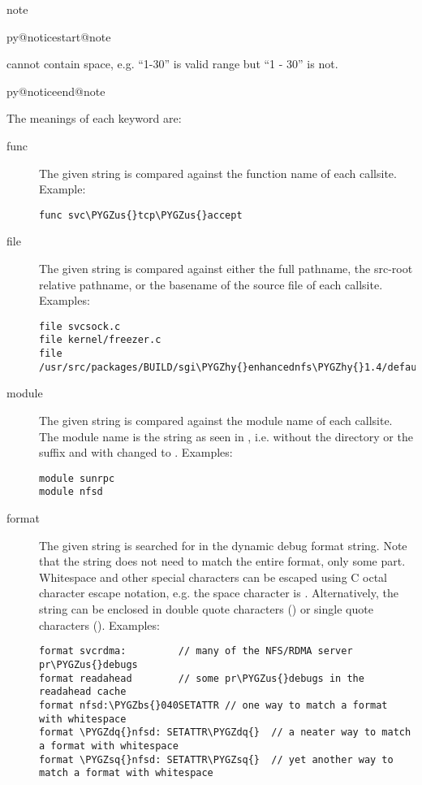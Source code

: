 \documentclass[a4paper,8pt,english]{sphinxmanual}
\makeatletter
\renewenvironment{notice}[2]{%
          \def\py@noticetype{#1}
          \begin{coloredbox}{#1}
          \bf\it
          \par\strong{#2}
          \csname py@noticestart@#1\endcsname
        }
	{
          \csname py@noticeend@\py@noticetype\endcsname
          \end{coloredbox}
        }
\def\PYGZbs{\char`\\}
\def\PYGZus{\char`\_}
\def\PYGZhy{\char`\-}
\def\PYGZsq{\char`\'}
\def\PYGZdq{\char`\"}
\renewcommand\PYGZsq{\textquotesingle}
\makeatother
\begin{document}
\begin{notice}{note}{Note:}
 cannot contain space, e.g.
``1-30'' is valid range but ``1 - 30'' is not.
\end{notice}

The meanings of each keyword are:
\begin{description}
\item[{func}] \leavevmode
The given string is compared against the function name
of each callsite.  Example:

\begin{Verbatim}[commandchars=\\\{\}]
func svc\PYGZus{}tcp\PYGZus{}accept
\end{Verbatim}

\item[{file}] \leavevmode
The given string is compared against either the full pathname, the
src-root relative pathname, or the basename of the source file of
each callsite.  Examples:

\begin{Verbatim}[commandchars=\\\{\}]
file svcsock.c
file kernel/freezer.c
file /usr/src/packages/BUILD/sgi\PYGZhy{}enhancednfs\PYGZhy{}1.4/default/net/sunrpc/svcsock.c
\end{Verbatim}

\item[{module}] \leavevmode
The given string is compared against the module name
of each callsite.  The module name is the string as
seen in , i.e. without the directory or the 
suffix and with \code{-} changed to \code{\_}.  Examples:

\begin{Verbatim}[commandchars=\\\{\}]
module sunrpc
module nfsd
\end{Verbatim}

\item[{format}] \leavevmode
The given string is searched for in the dynamic debug format
string.  Note that the string does not need to match the
entire format, only some part.  Whitespace and other
special characters can be escaped using C octal character
escape  notation, e.g. the space character is .
Alternatively, the string can be enclosed in double quote
characters () or single quote characters ().
Examples:

\begin{Verbatim}[commandchars=\\\{\}]
format svcrdma:         // many of the NFS/RDMA server pr\PYGZus{}debugs
format readahead        // some pr\PYGZus{}debugs in the readahead cache
format nfsd:\PYGZbs{}040SETATTR // one way to match a format with whitespace
format \PYGZdq{}nfsd: SETATTR\PYGZdq{}  // a neater way to match a format with whitespace
format \PYGZsq{}nfsd: SETATTR\PYGZsq{}  // yet another way to match a format with whitespace
\end{Verbatim}


\end{description}
\end{document}
